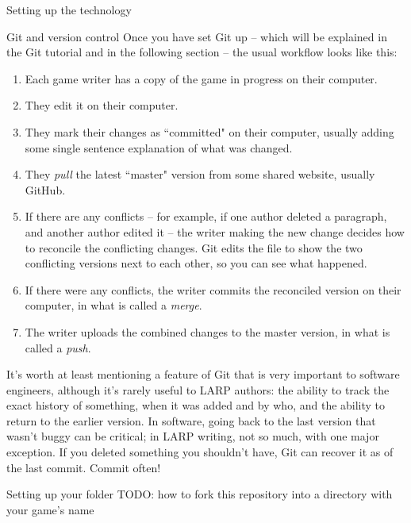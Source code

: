 \documentclass{article}
\begin{document}
\begin{section}{Setting up the technology}
\begin{subsection}{Git and version control}
Once you have set Git up -- which will be explained in the Git tutorial and in the following section -- the usual workflow looks like this:
\begin{enumerate}
\item Each game writer has a copy of the game in progress on their computer.
\item They edit it on their computer.
\item They mark their changes as ``committed" on their computer, usually adding some single sentence explanation of what was changed.
\item They \textit{pull} the latest ``master" version from some shared website, usually GitHub.  
\item If there are any conflicts – for example, if one author deleted a paragraph, and another author edited it – the writer making the new change decides how to reconcile the conflicting changes.  Git edits the file to show the two conflicting versions next to each other, so you can see what happened.
\item If there were any conflicts, the writer commits the reconciled version on their computer, in what is called a \textit{merge}.
\item The writer uploads the combined changes to the master version, in what is called a \textit{push}.
\end{enumerate}

It's worth at least mentioning a feature of Git that is very important to software engineers, although it's rarely useful to LARP authors: the ability to track the exact history of something, when it was added and by who, and the ability to return to the earlier version.  In software, going back to the last version that wasn't buggy can be critical; in LARP writing, not so much, with one major exception.  If you deleted something you shouldn't have, Git can recover it as of the last commit.  Commit often!

\end{subsection}
\begin{subsection}{Setting up your \gametex{} folder}
TODO: how to fork this repository into a directory with your game's name
\end{subsection}
\end{section}
\end{document}
